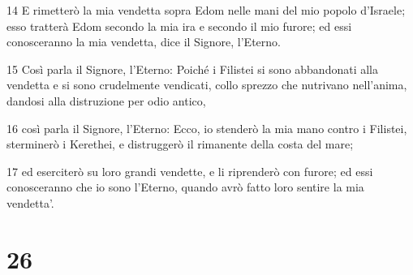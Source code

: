 \par 14 E rimetterò la mia vendetta sopra Edom nelle mani del mio popolo d'Israele; esso tratterà Edom secondo la mia ira e secondo il mio furore; ed essi conosceranno la mia vendetta, dice il Signore, l'Eterno.
\par 15 Così parla il Signore, l'Eterno: Poiché i Filistei si sono abbandonati alla vendetta e si sono crudelmente vendicati, collo sprezzo che nutrivano nell'anima, dandosi alla distruzione per odio antico,
\par 16 così parla il Signore, l'Eterno: Ecco, io stenderò la mia mano contro i Filistei, sterminerò i Kerethei, e distruggerò il rimanente della costa del mare;
\par 17 ed eserciterò su loro grandi vendette, e li riprenderò con furore; ed essi conosceranno che io sono l'Eterno, quando avrò fatto loro sentire la mia vendetta'.

\chapter{26}

